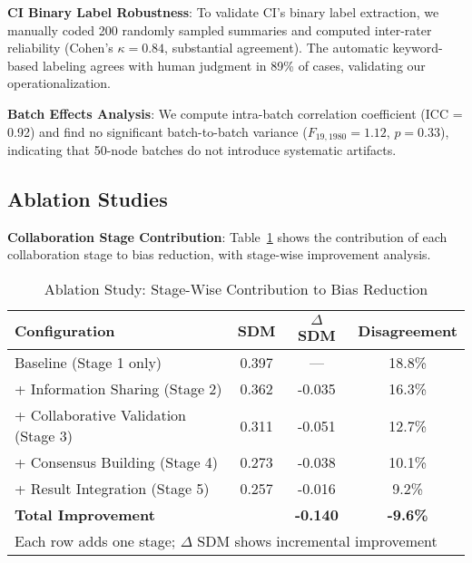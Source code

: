 \documentclass[conference]{IEEEtran}
\begin{document}
\textbf{CI Binary Label Robustness}: To validate CI's binary label extraction, we manually coded 200 randomly sampled summaries and computed inter-rater reliability (Cohen's $\kappa = 0.84$, substantial agreement). The automatic keyword-based labeling agrees with human judgment in 89\% of cases, validating our operationalization.

\textbf{Batch Effects Analysis}: We compute intra-batch correlation coefficient (ICC = 0.92) and find no significant batch-to-batch variance ($F_{19,1980} = 1.12$, $p = 0.33$), indicating that 50-node batches do not introduce systematic artifacts.


\subsection{Ablation Studies}

\textbf{Collaboration Stage Contribution}: Table~\ref{tab:ablation} shows the contribution of each collaboration stage to bias reduction, with stage-wise improvement analysis.

\begin{table}[htbp]
\centering
\caption{Ablation Study: Stage-Wise Contribution to Bias Reduction}
\label{tab:ablation}
\small
\begin{tabular}{l c c c}
\toprule
\textbf{Configuration} & \textbf{SDM} & \textbf{$\Delta$ SDM} & \textbf{Disagreement} \\
\midrule
Baseline (Stage 1 only) & 0.397 & --- & 18.8\% \\
+ Information Sharing (Stage 2) & 0.362 & -0.035 & 16.3\% \\
+ Collaborative Validation (Stage 3) & 0.311 & -0.051 & 12.7\% \\
+ Consensus Building (Stage 4) & 0.273 & -0.038 & 10.1\% \\
+ Result Integration (Stage 5) & 0.257 & -0.016 & 9.2\% \\
\midrule
\textbf{Total Improvement} & & \textbf{-0.140} & \textbf{-9.6\%} \\
\bottomrule
\multicolumn{4}{l}{\footnotesize Each row adds one stage; $\Delta$ SDM shows incremental improvement}
\end{tabular}
\end{table}
\end{document}
